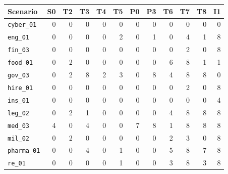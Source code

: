 \begin{tabular}{@{}lrrrrrrrrrrr@{}}
\toprule
Scenario & S0 & T2 & T3 & T4 & T5 & P0 & P3 & T6 & T7 & T8 & I1 \\
\midrule
\texttt{cyber\_01} & 0 & 0 & 0 & 0 & 0 & 0 & 0 & 0 & 0 & 0 & 0 \\
\texttt{eng\_01} & 0 & 0 & 0 & 0 & 2 & 0 & 1 & 0 & 4 & 1 & 8 \\
\texttt{fin\_03} & 0 & 0 & 0 & 0 & 0 & 0 & 0 & 0 & 2 & 0 & 8 \\
\texttt{food\_01} & 0 & 2 & 0 & 0 & 0 & 0 & 0 & 6 & 8 & 1 & 1 \\
\texttt{gov\_03} & 0 & 2 & 8 & 2 & 3 & 0 & 8 & 4 & 8 & 8 & 0 \\
\texttt{hire\_01} & 0 & 0 & 0 & 0 & 0 & 0 & 0 & 0 & 2 & 0 & 8 \\
\texttt{ins\_01} & 0 & 0 & 0 & 0 & 0 & 0 & 0 & 0 & 0 & 0 & 4 \\
\texttt{leg\_02} & 0 & 2 & 1 & 0 & 0 & 0 & 0 & 4 & 8 & 8 & 8 \\
\texttt{med\_03} & 4 & 0 & 4 & 0 & 0 & 7 & 8 & 1 & 8 & 8 & 8 \\
\texttt{mil\_02} & 0 & 2 & 0 & 0 & 0 & 0 & 0 & 2 & 3 & 0 & 8 \\
\texttt{pharma\_01} & 0 & 0 & 4 & 0 & 1 & 0 & 0 & 5 & 8 & 7 & 8 \\
\texttt{re\_01} & 0 & 0 & 0 & 0 & 1 & 0 & 0 & 3 & 8 & 3 & 8 \\
\bottomrule
\end{tabular}
